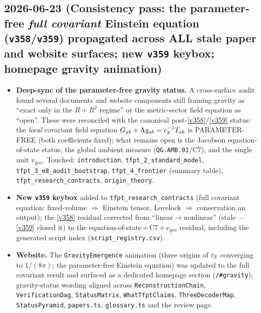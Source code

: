 \subsection*{2026-06-23 (Consistency pass: the parameter-free \emph{full covariant} Einstein equation (\texttt{v358}/\texttt{v359}) propagated across ALL stale paper and website surfaces; new \texttt{v359} keybox; homepage gravity animation)}
\begin{itemize}
\item \textbf{Deep-sync of the parameter-free gravity status.} A cross-surface audit found several
documents and website components still framing gravity as ``exact only in the $R+R^2$ regime'' or the
metric-sector field equation as ``open''. These were reconciled with the canonical post-\vref{v358}/\vref{v359}
status: the \emph{local} covariant field equation $G_{ab}+\Lambda g_{ab}=c_3^{-1}T_{ab}$ is
PARAMETER-FREE (both coefficients fixed); what remains open is the Jacobson equation-of-state status, the
global ambient measure (\texttt{QG.AMB.01}/C7), and the single unit $v_{\mathrm{geo}}$. Touched:
\texttt{introduction}, \texttt{tfpt\_2\_standard\_model}, \texttt{tfpt\_3\_e8\_audit\_bootstrap},
\texttt{tfpt\_4\_frontier} (summary table), \texttt{tfpt\_research\_contracts}, \texttt{origin\_theory}.
\item \textbf{New \texttt{v359} keybox} added to \texttt{tfpt\_research\_contracts} (full covariant equation:
fixed-volume $\Rightarrow$ Einstein tensor, Lovelock $\Rightarrow$ conservation an output); the \vref{v358}
residual corrected from ``linear$\to$nonlinear'' (stale --- \vref{v359} closed it) to the
equation-of-state\,$+$\,C7\,$+\,v_{\mathrm{geo}}$ residual, including the generated script index
(\texttt{script\_registry.csv}).
\item \textbf{Website.} The \texttt{GravityEmergence} animation (three origins of $c_3$ converging to
$1/(8\pi)$; the parameter-free Einstein equation) was updated to the full covariant result and surfaced as a
dedicated homepage section (\texttt{/\#gravity}); gravity-status wording aligned across
\texttt{ReconstructionChain}, \texttt{VerificationDag}, \texttt{StatusMatrix}, \texttt{WhatTfptClaims},
\texttt{ThreeDecoderMap}, \texttt{StatusPyramid}, \texttt{papers.ts}, \texttt{glossary.ts} and the review page.
\end{itemize}


